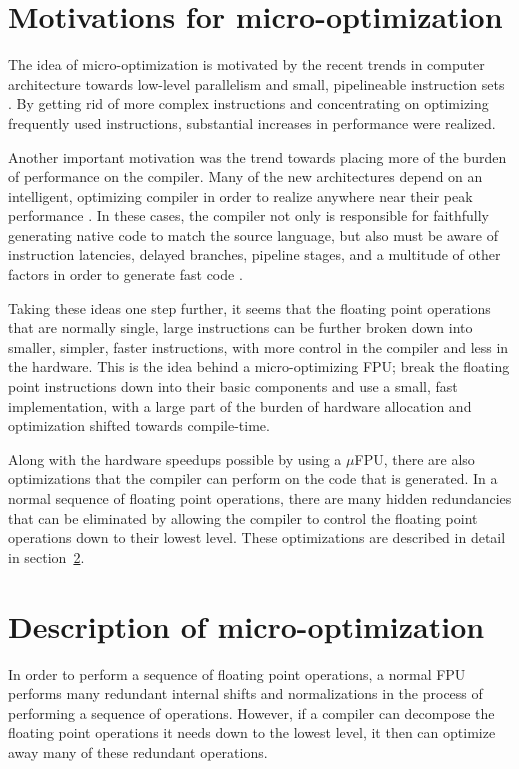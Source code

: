 \section{Motivations for micro-optimization}

The idea of micro-optimization is motivated by the recent trends in computer
architecture towards low-level parallelism and small, pipelineable
instruction sets \cite{patterson:risc,rad83}.  By getting rid of more
complex instructions and concentrating on optimizing frequently used
instructions, substantial increases in performance were realized.

Another important motivation was the trend towards placing more of the
burden of performance on the compiler.  Many of the new architectures depend
on an intelligent, optimizing compiler in order to realize anywhere near
their peak performance
\cite{ellis:bulldog,pet87,coutant:precision-compilers}.  In these cases, the
compiler not only is responsible for faithfully generating native code to
match the source language, but also must be aware of instruction latencies,
delayed branches, pipeline stages, and a multitude of other factors in order
to generate fast code \cite{gib86}.

Taking these ideas one step further, it seems that the floating point
operations that are normally single, large instructions can be further broken
down into smaller, simpler, faster instructions, with more control in the
compiler and less in the hardware.  This is the idea behind a
micro-optimizing FPU; break the floating point instructions down into their
basic components and use a small, fast implementation, with a large part of
the burden of hardware allocation and optimization shifted towards
compile-time.

Along with the hardware speedups possible by using a $\mu$FPU, there are
also optimizations that the compiler can perform on the code that is
generated.  In a normal sequence of floating point operations, there are
many hidden redundancies that can be eliminated by allowing the compiler to
control the floating point operations down to their lowest level.  These
optimizations are described in detail in section~\ref{ch1:opts}.

\section{Description of micro-optimization}\label{ch1:opts}

In order to perform a sequence of floating point operations, a normal FPU
performs many redundant internal shifts and normalizations in the process of
performing a sequence of operations.  However, if a compiler can
decompose the floating point operations it needs down to the lowest level,
it then can optimize away many of these redundant operations.  

